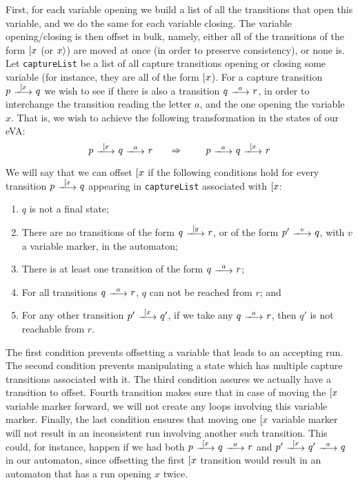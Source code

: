 First, for each variable opening we build a list of all the transitions that
open this variable, and we do the same for each variable closing. The variable
opening/closing is then offset in bulk, namely, either all of the transitions of
the form $[ x$ (or $x \rangle$) are moved at once (in order to preserve
consistency), or none is. Let \texttt{captureList} be a list of all capture
transitions opening or closing some variable (for instance, they are all of the
form $[ x$). For a capture transition $p\ \longtrans{\Open{x}}\ q$ we wish
to see if there is also a transition $q\ \longtrans{a}\ r$, in order to
interchange the transition reading the letter $a$, and the one opening the
variable $x$. That is, we wish to achieve the following transformation in the
states of our eVA:
$$p\ \longtrans{\Open{x}}\ q\ \longtrans{a}\ r \ \ \ \ \ \Rightarrow \ \ \ \ \ \
\ p\ \longtrans{a}\ q\ \longtrans{\Open{x}}\ r$$


We will say that we can offset $[ x$ if the following conditions hold for
every transition $p\ \longtrans{\Open{x}}\ q$ appearing in \texttt{captureList}
associated with $[ x$:
\begin{enumerate}
	\item $q$ is not a final state;
	\item There are no transitions of the form $q\ \longtrans{\Open{y}}\ r$, or
	of the form $p'\ \longtrans{v}\ q$, with $v$ a variable marker, in the
	automaton; \label{item:offset-cond-2}
	\item There is at least one transition of the form $q\ \longtrans{a}\ r$;
	\item For all transitions $q\ \longtrans{a}\ r$, $q$ can not be reached from
	$r$; and
	\item For any other transition $p'\ \longtrans{\Open{x}}\ q'$, if we take
	any $q\ \longtrans{a}\ r$, then $q'$ is not reachable from $r$.
\end{enumerate}

The first condition prevents offsetting a variable that leads to an accepting
run. The second condition prevents manipulating a state which has multiple
capture transitions associated with it. The third condition assures we actually
have a transition to offset. Fourth transition makes sure that in case of moving
the $[ x$ variable marker forward, we will not create any loops involving
this variable marker. Finally, the last condition ensures that moving one
$[ x$ variable marker will not result in an inconsistent run involving
another such transition. This could, for instance, happen if we had both $p\
\longtrans{\Open{x}}\ q\ \longtrans{a}\ r$ and $p'\ \longtrans{\Open{x}}\ q'\
\longtrans{a}\ q$ in our automaton, since offsetting the first $[ x$
transition would result in an automaton that has a run opening $x$ twice.

